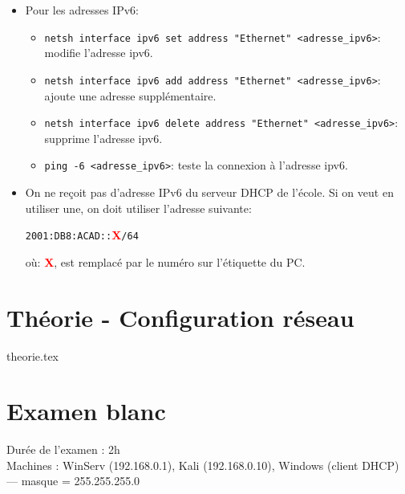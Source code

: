 \documentclass[a4paper]{article}
\renewcommand{\tt}{\texttt}
\begin{document}
\begin{itemize}
\item Pour les adresses IPv6:
\begin{itemize}
    \item \tt{netsh interface ipv6 set address "Ethernet" <adresse\_ipv6>}: modifie l'adresse ipv6.
    \item \tt{netsh interface ipv6 add address "Ethernet" <adresse\_ipv6>}: ajoute une adresse supplémentaire.
    \item \tt{netsh interface ipv6 delete address "Ethernet" <adresse\_ipv6>}: supprime l'adresse ipv6.
    \item \tt{ping -6 <adresse\_ipv6>}: teste la connexion à l'adresse ipv6.
\end{itemize}





\item On ne reçoit pas d'adresse IPv6 du serveur DHCP de l'école. Si on veut en utiliser une, on doit utiliser l'adresse suivante:
\begin{center}
    \tt{2001:DB8:ACAD::}\textcolor{red}{\textbf{X}}\tt{/64}
\end{center}
où: \textcolor{red}{\textbf{X}}, est remplacé par le numéro sur l'étiquette du PC.

\end{itemize}
















\section{Théorie - Configuration réseau}

{theorie.tex}















\newpage \section{Examen blanc}

Durée de l’examen : 2h \\
Machines : WinServ (192.168.0.1), Kali (192.168.0.10), Windows (client DHCP) --- masque = 255.255.255.0
\end{document}
